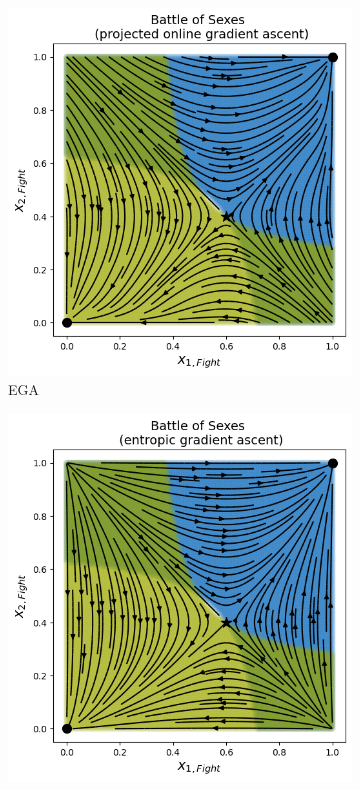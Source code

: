 \begin{figure}[H]
\captionsetup{justification=centering}
\centering
\begin{subfigure}{.5\textwidth}
    \centering
    \includegraphics[width=\textwidth]{logos/BattleOfSexes1.png}
    \caption{EGA}
\end{subfigure}%
\begin{subfigure}{.5\textwidth}
    \centering
    \includegraphics[width=\textwidth]{logos/BattleOfSexes2.png}

\end{subfigure}
\end{figure}
